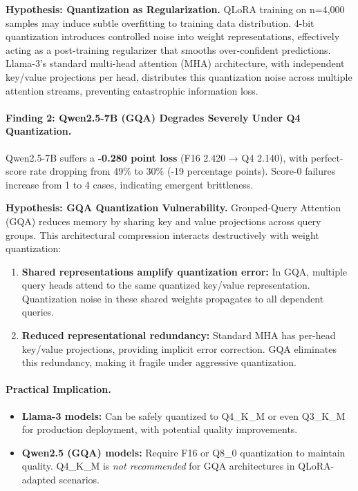 \documentclass[twocolumn]{article}
\begin{document}
\textbf{Hypothesis: Quantization as Regularization.}
QLoRA training on n=4,000 samples may induce subtle overfitting to training data distribution.
4-bit quantization introduces controlled noise into weight representations, effectively
acting as a post-training regularizer that smooths over-confident predictions.
Llama-3's standard multi-head attention (MHA) architecture, with independent key/value
projections per head, distributes this quantization noise across multiple attention streams,
preventing catastrophic information loss.

\paragraph{Finding 2: Qwen2.5-7B (GQA) Degrades Severely Under Q4 Quantization.}

Qwen2.5-7B suffers a \textbf{-0.280 point loss} (F16 2.420 → Q4 2.140), with perfect-score
rate dropping from 49\% to 30\% (-19 percentage points).
Score-0 failures increase from 1 to 4 cases, indicating emergent brittleness.

\textbf{Hypothesis: GQA Quantization Vulnerability.}
Grouped-Query Attention (GQA) reduces memory by sharing key and value projections across
query groups.
This architectural compression interacts destructively with weight quantization:
\begin{enumerate}
  \item \textbf{Shared representations amplify quantization error:} In GQA, multiple query
        heads attend to the same quantized key/value representation. Quantization noise
        in these shared weights propagates to all dependent queries.
  \item \textbf{Reduced representational redundancy:} Standard MHA has per-head key/value
        projections, providing implicit error correction. GQA eliminates this redundancy,
        making it fragile under aggressive quantization.
\end{enumerate}

\paragraph{Practical Implication.}
\begin{itemize}
  \item \textbf{Llama-3 models:} Can be safely quantized to Q4\_K\_M or even Q3\_K\_M
        for production deployment, with potential quality improvements.
  \item \textbf{Qwen2.5 (GQA) models:} Require F16 or Q8\_0 quantization to maintain quality.
        Q4\_K\_M is \emph{not recommended} for GQA architectures in QLoRA-adapted scenarios.
\end{itemize}
\end{document}
